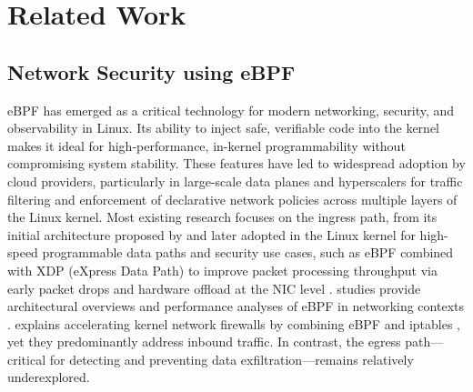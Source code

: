 \documentclass [11pt, proquest] {uwthesis}[2020/02/24]
\begin{document}
\chapter {Related Work}
\section{Network Security using eBPF}
eBPF has emerged as a critical technology for modern networking, security, and observability in Linux. Its ability to inject safe, verifiable code into the kernel makes it ideal for high-performance, in-kernel programmability without compromising system stability. These features have led to widespread adoption by cloud providers, particularly in large-scale data planes and hyperscalers for traffic filtering and enforcement of declarative network policies across multiple layers of the Linux kernel. Most existing research focuses on the ingress path, from its initial architecture proposed by \citeauthor{10.1145/3281411.3281443} and later adopted in the Linux kernel for high-speed programmable data paths and security use cases, such as eBPF combined with XDP (eXpress Data Path) to improve packet processing throughput via early packet drops and hardware offload at the NIC level \cite{10.1145/3281411.3281443, 8850758}.
\citeauthor{10.1145/3371038} studies provide architectural overviews and performance analyses of eBPF in networking contexts \cite{10.1145/3371038}. \citeauthor{bertrone2018accelerating} explains accelerating kernel network firewalls by combining eBPF and iptables \cite{bertrone2018accelerating}, yet they predominantly address inbound traffic. In contrast, the egress path—critical for detecting and preventing data exfiltration—remains relatively underexplored. 

\end{document}

